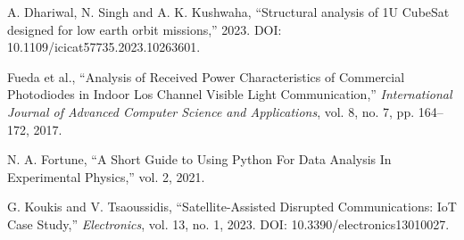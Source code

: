 \begin{thebibliography}{99}
 A. Dhariwal, N. Singh and A. K. Kushwaha, ``Structural analysis of 1U CubeSat designed for low earth orbit missions,'' 2023. DOI: 10.1109/icicat57735.2023.10263601.

 Fueda et al., ``Analysis of Received Power Characteristics of Commercial Photodiodes in Indoor Los Channel Visible Light Communication,'' \textit{International Journal of Advanced Computer Science and Applications}, vol. 8, no. 7, pp. 164--172, 2017.

 N. A. Fortune, ``A Short Guide to Using Python For Data Analysis In Experimental Physics,'' vol. 2, 2021.

 G. Koukis and V. Tsaoussidis, ``Satellite-Assisted Disrupted Communications: IoT Case Study,'' \textit{Electronics}, vol. 13, no. 1, 2023. DOI: 10.3390/electronics13010027.

\end{thebibliography}